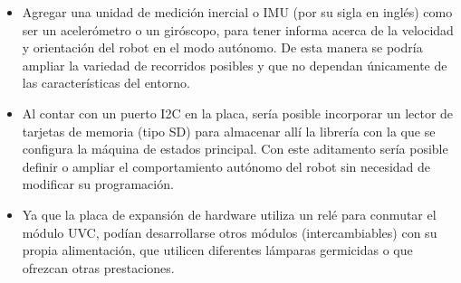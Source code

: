 \begin{itemize}
	\item Agregar una unidad de medición inercial o IMU (por su sigla en inglés) como ser un acelerómetro o un giróscopo, para tener informa acerca de la velocidad y orientación del robot  en el modo autónomo. De esta manera se podría ampliar la variedad de recorridos posibles y que no dependan únicamente de las características del entorno. 
	\item Al contar con un puerto I2C en la placa, sería posible incorporar un lector de tarjetas de memoria (tipo SD) para almacenar allí la librería con la que se configura la máquina de estados principal. Con este aditamento sería posible definir o ampliar el comportamiento autónomo del robot sin necesidad de modificar su programación. 		
	\item Ya que la placa de expansión de hardware utiliza un relé para conmutar el módulo UVC, podían desarrollarse otros módulos (intercambiables) con su propia alimentación, que utilicen diferentes lámparas germicidas o que ofrezcan otras prestaciones.  

\end{itemize}
